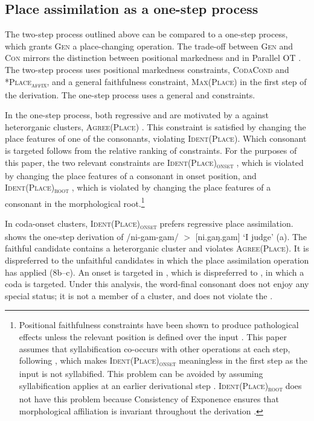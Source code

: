 \documentclass[output=paper,modfonts,nonflat,draftmode]{langsci/langscibook}
\begin{document}
{{\subsection{Place assimilation as a one-step process}

The two-step process outlined above can be compared to a one-step process, which grants \textsc{Gen} a place-changing operation. The trade-off between \textsc{Gen} and \textsc{Con} mirrors the distinction between positional markedness and  in Parallel OT \citep{zoll2004}. The two-step process uses positional markedness constraints, \textsc{CodaCond} and \textsc{*Place\textsubscript{affix}}, and a general faithfulness constraint, \textsc{Max(Place)} in the first step of the derivation. The one-step process uses a general  and  constraints.

In the one-step process, both regressive and  are motivated by a  against heterorganic clusters, \textsc{Agree(Place)} \citep{yip1991,lombardi1999,bakovic2000,bakovic2007}. This constraint is satisfied by changing the place features of one of the consonants, violating \textsc{Ident(Place)}. Which consonant is targeted follows from the relative ranking of  constraints. For the purposes of this paper, the two relevant constraints are \textsc{Ident(Place)\textsubscript{onset}} \citep{beckman1998}, which is violated by changing the place features of a consonant in onset position, and \textsc{Ident(Place)\textsubscript{root}} \citep{mccarthyprince1995}, which is violated by changing the place features of a consonant in the morphological root.\footnote{Positional faithfulness constraints have been shown to produce pathological effects unless the relevant position is defined over the input \citep{jesney2011}. This paper assumes that syllabification co-occurs with other operations at each step, following \citet{mccarthy2008}, which makes \textsc{Ident(Place)\textsubscript{onset}} meaningless in the first step as the input is not syllabified. This problem can be avoided by assuming syllabification applies at an earlier derivational step \citep{elfner2009}. \textsc{Ident(Place)\textsubscript{root}} does not have this problem because Consistency of Exponence ensures that morphological affiliation is invariant throughout the derivation \citep{mccarthyprince1993b}.}

In coda-onset clusters, \textsc{Ident(Place)\textsubscript{onset}} prefers regressive place assimilation.  shows the one-step derivation of /{ni-gam-gam}/ $>$ [{ni.gaŋ.gam}] `I judge' (a). The faithful candidate  contains a heterorganic cluster and violates \textsc{Agree(Place)}. It is dispreferred to the unfaithful candidates in which the place assimilation operation has applied (8b--c). An onset is targeted in , which is dispreferred to , in which a coda is targeted. Under this analysis, the word-final consonant does not enjoy any special status; it is not a member of a cluster, and does not violate the .

}}
\end{document}
